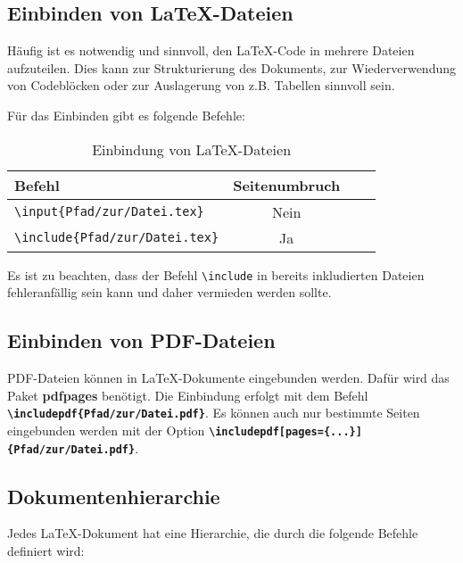 \subsection{Einbinden von \LaTeX{}-Dateien}
\label{sec:einbinden_von_latex_dateien}
Häufig ist es notwendig und sinnvoll, den \LaTeX{}-Code in mehrere Dateien aufzuteilen. Dies kann zur Strukturierung des Dokuments, zur Wiederverwendung von Codeblöcken oder zur Auslagerung von z.B. Tabellen sinnvoll sein.

Für das Einbinden gibt es folgende Befehle:
\begin{table}[H]
    \centering
    \renewcommand{\arraystretch}{1.1}
    \begin{tabular}{lccc}
        \toprule
        \textbf{Befehl}                                       & \textbf{Seitenumbruch} \\
        \midrule
        \texttt{\textbackslash input\{Pfad/zur/Datei.tex\}}   & Nein                   \\
        \texttt{\textbackslash include\{Pfad/zur/Datei.tex\}} & Ja                     \\

        \bottomrule
    \end{tabular}
    \caption{Einbindung von \LaTeX{}-Dateien}
    \label{tab:latex_einbindung}
\end{table}

Es ist zu beachten, dass der Befehl \texttt{\textbackslash include} in bereits inkludierten Dateien fehleranfällig sein kann und daher vermieden werden sollte.

\subsection{Einbinden von PDF-Dateien}
\label{sec:einbinden_von_pdf_dateien}
PDF-Dateien können in \LaTeX{}-Dokumente eingebunden werden. Dafür wird das Paket \textbf{pdfpages} benötigt. Die Einbindung erfolgt mit dem Befehl \textbf{\texttt{\textbackslash includepdf\{Pfad/zur/Datei.pdf\}}}. Es können auch nur bestimmte Seiten eingebunden werden mit der Option \textbf{\texttt{\textbackslash includepdf[pages=\{...\}]\{Pfad/zur/Datei.pdf\}}}.


\subsection{Dokumentenhierarchie}
Jedes \LaTeX{}-Dokument hat eine Hierarchie, die durch die folgende Befehle definiert wird:

